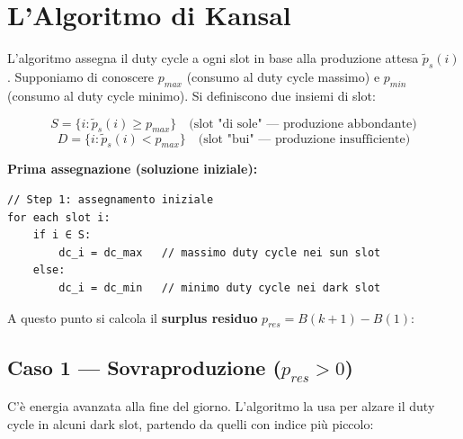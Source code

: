 \documentclass[
  italian,
  openany]{book}
\begin{document}
\section{L'Algoritmo di Kansal}\label{lalgoritmo-di-kansal}

L'algoritmo assegna il duty cycle a ogni slot in base alla produzione
attesa \(\tilde{p}_s(i)\). Supponiamo di conoscere \(p_{max}\) (consumo
al duty cycle massimo) e \(p_{min}\) (consumo al duty cycle minimo). Si
definiscono due insiemi di slot:

\[
S = \{i : \tilde{p}_s(i) \geq p_{max}\} \quad \text{(slot "di sole" — produzione abbondante)}
\] \[
D = \{i : \tilde{p}_s(i) < p_{max}\} \quad \text{(slot "bui" — produzione insufficiente)}
\]

\textbf{Prima assegnazione (soluzione iniziale):}

\begin{verbatim}
// Step 1: assegnamento iniziale
for each slot i:
    if i ∈ S:
        dc_i = dc_max   // massimo duty cycle nei sun slot
    else:
        dc_i = dc_min   // minimo duty cycle nei dark slot
\end{verbatim}

A questo punto si calcola il \textbf{surplus residuo}
\(p_{res} = B(k+1) - B(1)\):

\subsection{\texorpdfstring{Caso 1 --- Sovraproduzione
(\(p_{res} > 0\))}{Caso 1 --- Sovraproduzione (p\_\{res\} \textgreater{} 0)}}\label{caso-1-sovraproduzione-p_res-0}

C'è energia avanzata alla fine del giorno. L'algoritmo la usa per alzare
il duty cycle in alcuni dark slot, partendo da quelli con indice più
piccolo:
\end{document}
